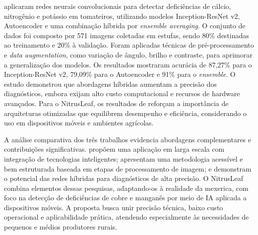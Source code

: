 \textcite{Tran2019} aplicaram redes neurais convolucionais para detectar deficiências de cálcio, nitrogênio e potássio em tomateiros, utilizando modelos Inception-ResNet v2, Autoencoder e uma combinação híbrida por \textit{ensemble averaging}. O conjunto de dados foi composto por 571 imagens coletadas em estufas, sendo 80\% destinadas ao treinamento e 20\% à validação. Foram aplicadas técnicas de pré-processamento e \textit{data augmentation}, como variação de ângulo, brilho e contraste, para aprimorar a generalização dos modelos. Os resultados mostraram acurácia de 87,27\% para o Inception-ResNet v2, 79,09\% para o Autoencoder e 91\% para o \textit{ensemble}. O estudo demonstrou que abordagens híbridas aumentam a precisão dos diagnósticos, embora exijam alto custo computacional e recursos de hardware avançados. Para o NitrusLeaf, os resultados de \textcite{Tran2019} reforçam a importância de arquiteturas otimizadas que equilibrem desempenho e eficiência, considerando o uso em dispositivos móveis e ambientes agrícolas.

A análise comparativa dos três trabalhos evidencia abordagens complementares e contribuições significativas. \textcite{Muthusamy2023} propõem uma aplicação em larga escala com integração de tecnologias inteligentes; \textcite{Ghorai2021} apresentam uma metodologia acessível e bem estruturada baseada em etapas de processamento de imagem; e \textcite{Tran2019} demonstram o potencial das redes híbridas para diagnósticos de alta precisão. O NitrusLeaf combina elementos dessas pesquisas, adaptando-os à realidade da mexerica, com foco na detecção de deficiências de cobre e manganês por meio de IA aplicada a dispositivos móveis. A proposta busca unir precisão técnica, baixo custo operacional e aplicabilidade prática, atendendo especialmente às necessidades de pequenos e médios produtores rurais.